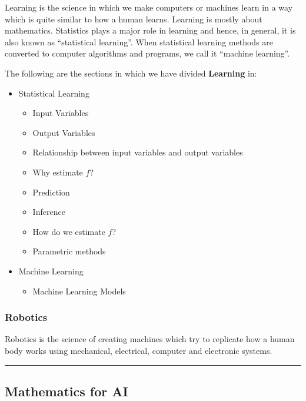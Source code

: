 \documentclass[11pt]{article}
\providecommand{\tightlist}{%
      \setlength{\itemsep}{0pt}\setlength{\parskip}{0pt}}
\begin{document}
Learning is the science in which we make computers or machines learn in
a way which is quite similar to how a human learns. Learning is mostly
about mathematics. Statistics plays a major role in learning and hence,
in general, it is also known as ``statistical learning''. When
statistical learning methods are converted to computer algorithms and
programs, we call it ``machine learning''.

The following are the sections in which we have divided
\textbf{Learning} in:

\begin{itemize}
\tightlist
\item
  Statistical Learning

  \begin{itemize}
  \tightlist
  \item
    Input Variables
  \item
    Output Variables
  \item
    Relationship between input variables and output variables
  \item
    Why estimate \(f\)?
  \item
    Prediction
  \item
    Inference
  \item
    How do we estimate \(f\)?
  \item
    Parametric methods
  \end{itemize}
\item
  Machine Learning

  \begin{itemize}
  \tightlist
  \item
    Machine Learning Models
  \end{itemize}
\end{itemize}

    \hypertarget{robotics}{%
\subsubsection{Robotics}\label{robotics}}

Robotics is the science of creating machines which try to replicate how
a human body works using mechanical, electrical, computer and electronic
systems.

    \begin{center}\rule{0.5\linewidth}{\linethickness}\end{center}

    \hypertarget{mathematics-for-ai}{%
\subsection{Mathematics for AI}\label{mathematics-for-ai}}
\end{document}
